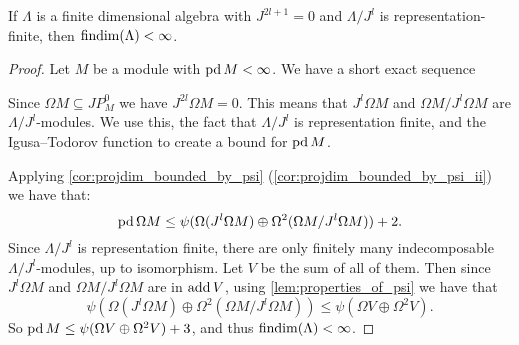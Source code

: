 \begin{theorem}\cite{Wang94}\label{thm:half_rep_finite}
	If $\Lambda$ is a finite dimensional algebra with $J^{2l+1} = 0$ and $\Lambda / J^l$ is representation-finite, then $\operatorname{findim}(\Lambda) < \infty$.
	\begin{proof}
		Let $M$ be a module with $\operatorname{pd} M < \infty$. We have a short exact sequence 
		\begin{center}
		\end{center}
		Since $\Omega M \subseteq JP^0_M$ we have $J^{2l}\Omega M = 0$. This means that $J^l\Omega M$ and $\Omega M / J^l\Omega M$ are $\Lambda / J^l$-modules. We use this, the fact that $\Lambda / J^l$ is representation finite, and the Igusa--Todorov function to create a bound for $\operatorname{pd} M$.
		
		Applying \cref{cor:projdim_bounded_by_psi} (\ref{cor:projdim_bounded_by_psi_ii}) we have that:
		$$ \operatorname{pd} \Omega M \leq \psi(\Omega (J^l\Omega M)\oplus\Omega^2(\Omega M / J^l\Omega M)) + 2.$$ 
		Since $\Lambda / J^l$ is representation finite, there are only finitely many indecomposable $\Lambda / J^l$-modules, up to isomorphism. Let $V$ be the sum of all of them. Then since $J^l\Omega M$ and $\Omega M / J^l\Omega M$ are in $\operatorname{add} V$, using \cref{lem:properties_of_psi} we have that 
		$$\psi(\Omega (J^l\Omega M)\oplus\Omega^2(\Omega M / J^l\Omega M)) \leq \psi(\Omega V \oplus \Omega^2 V).$$
		So $\operatorname{pd} M \leq \psi(\Omega V \oplus \Omega^2 V) + 3$, and thus $\operatorname{findim}(\Lambda) < \infty$.
	\end{proof}
\end{theorem}
